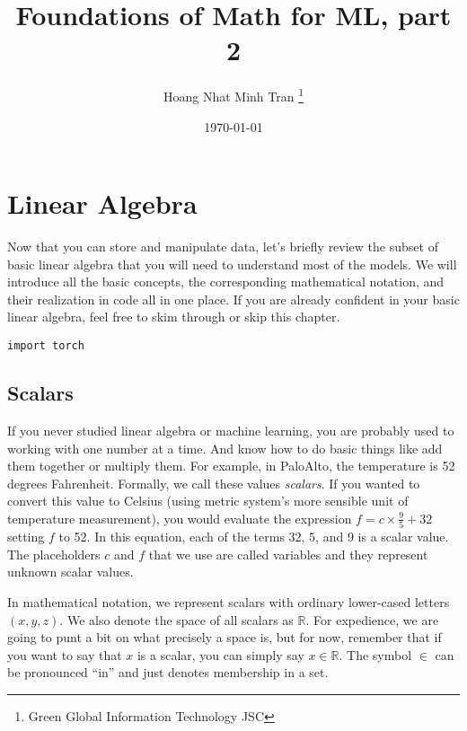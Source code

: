 \documentclass[]{article}
\title{Foundations of Math for ML, part 2}
\author{Hoang Nhat Minh Tran \thanks{Green Global Information Technology JSC}}
\date{\today}
\begin{document}
\maketitle

\begin{abstract}

\end{abstract}

\section{Linear Algebra}

Now that you can store and manipulate data, let’s briefly review the subset of basic linear algebra that you will need to understand most of the models. We will introduce all the basic concepts, the corresponding mathematical notation, and their realization in code all in one place. If you are already confident in your basic linear algebra, feel free to skim through or skip this chapter.

\begin{verbatim}
import torch
\end{verbatim}

\subsection{Scalars}

If you never studied linear algebra or machine learning, you are probably used to working with one number at a time. And know how to do basic things like add them together or multiply them. For example, in PaloAlto, the temperature is 52 degrees Fahrenheit. Formally, we call these values \textit{scalars}. If you wanted to convert this value to Celsius (using metric system’s more sensible unit of temperature measurement), you would evaluate the expression $ f = c \times \frac{9}{5} + 32 $ setting $ f $ to 52. In this equation, each of the terms 32, 5, and 9 is a scalar value. The placeholders $ c $ and $ f $ that we use are called variables and they represent unknown scalar values.

In mathematical notation, we represent scalars with ordinary lower-cased letters $ (x,y,z) $. We also denote the space of all scalars as $ \mathbb{R} $. For expedience, we are going to punt a bit on what precisely a space is, but for now, remember that if you want to say that $ x $ is a scalar, you can simply say $ x \in \mathbb{R} $. The symbol $ \in $ can be pronounced “in” and just denotes membership in a set.
\end{document}
